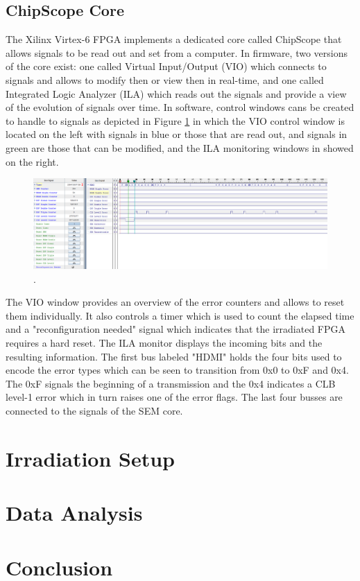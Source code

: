     \subsection{ChipScope Core}

      The Xilinx Virtex-6 FPGA implements a dedicated core called ChipScope that allows signals to be read out and set from a computer. In firmware, two versions of the core exist: one called Virtual Input/Output (VIO) which connects to signals and allows to modify then or view then in real-time, and one called Integrated Logic Analyzer (ILA) which reads out the signals and provide a view of the evolution of signals over time. In software, control windows cans be created to handle to signals as depicted in Figure \ref{fig:II-6-cs-clb} in which the VIO control window is located on the left with signals in blue or those that are read out, and signals in green are those that can be modified, and the ILA monitoring windows in showed on the right. \\

      \begin{figure}
        \centering
        \includegraphics[width=\textwidth]{img/II-6-irradiation/cs-clb.png}
        \caption{.}
        \label{fig:II-6-cs-clb}
      \end{figure}

      The VIO window provides an overview of the error counters and allows to reset them individually. It also controls a timer which is used to count the elapsed time and a "reconfiguration needed" signal which indicates that the irradiated FPGA requires a hard reset. The ILA monitor displays the incoming bits and the resulting information. The first bus labeled "HDMI" holds the four bits used to encode the error types which can be seen to transition from 0x0 to 0xF and 0x4. The 0xF signals the beginning of a transmission and the 0x4 indicates a CLB level-1 error which in turn raises one of the error flags. The last four busses are connected to the signals of the SEM core.

  \section{Irradiation Setup}

  \section{Data Analysis}

  \section{Conclusion}
